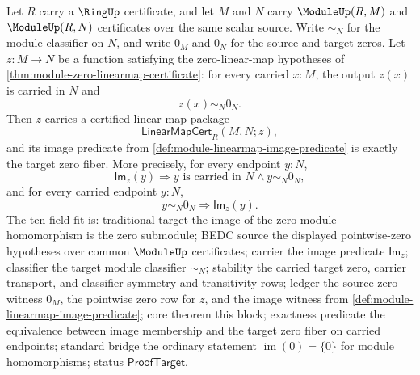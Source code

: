 \begin{theorem}
\label{thm:module-zero-linearmap-image-zero-fiber}
Let $R$ carry a $\RingUp$ certificate, and let $M$ and $N$ carry $\ModuleUp(R,M)$ and $\ModuleUp(R,N)$ certificates over the same scalar source. Write $\sim_N$ for the module classifier on $N$, and write $0_M$ and $0_N$ for the source and target zeros. Let $z:M\to N$ be a function satisfying the zero-linear-map hypotheses of \autoref{thm:module-zero-linearmap-certificate}: for every carried $x:M$, the output $z(x)$ is carried in $N$ and
$$
z(x)\sim_N0_N.
$$
Then $z$ carries a certified linear-map package
$$
\mathsf{LinearMapCert}_R(M,N;z),
$$
and its image predicate from \autoref{def:module-linearmap-image-predicate} is exactly the target zero fiber. More precisely, for every endpoint $y:N$,
$$
\mathsf{Im}_z(y)\Longrightarrow y\text{ is carried in }N\land y\sim_N0_N,
$$
and for every carried endpoint $y:N$,
$$
y\sim_N0_N\Longrightarrow \mathsf{Im}_z(y).
$$
The ten-field fit is: traditional target the image of the zero module homomorphism is the zero submodule; BEDC source the displayed pointwise-zero hypotheses over common $\ModuleUp$ certificates; carrier the image predicate $\mathsf{Im}_z$; classifier the target module classifier $\sim_N$; stability the carried target zero, carrier transport, and classifier symmetry and transitivity rows; ledger the source-zero witness $0_M$, the pointwise zero row for $z$, and the image witness from \autoref{def:module-linearmap-image-predicate}; core theorem this block; exactness predicate the equivalence between image membership and the target zero fiber on carried endpoints; standard bridge the ordinary statement $\operatorname{im}(0)=\{0\}$ for module homomorphisms; status $\mathsf{ProofTarget}$.
\end{theorem}
